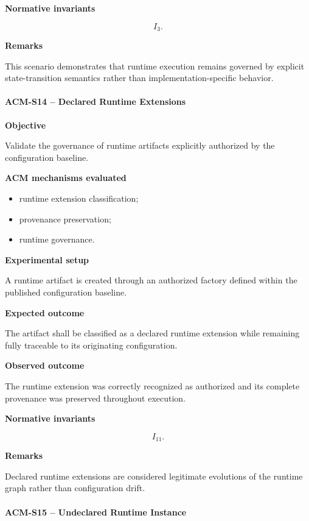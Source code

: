 \documentclass[10pt]{article}
\begin{document}
\textbf{Normative invariants}

\[
I_3.
\]

\textbf{Remarks}

This scenario demonstrates that runtime execution remains governed by explicit
state-transition semantics rather than implementation-specific behavior.

\paragraph{ACM-S14 -- Declared Runtime Extensions}

\textbf{Objective}

Validate the governance of runtime artifacts explicitly authorized by the
configuration baseline.

\textbf{ACM mechanisms evaluated}

\begin{itemize}
    \item runtime extension classification;
    \item provenance preservation;
    \item runtime governance.
\end{itemize}

\textbf{Experimental setup}

A runtime artifact is created through an authorized factory defined within the
published configuration baseline.

\textbf{Expected outcome}

The artifact shall be classified as a declared runtime extension while
remaining fully traceable to its originating configuration.

\textbf{Observed outcome}

The runtime extension was correctly recognized as authorized and its complete
provenance was preserved throughout execution.

\textbf{Normative invariants}

\[
I_{11}.
\]

\textbf{Remarks}

Declared runtime extensions are considered legitimate evolutions of the runtime
graph rather than configuration drift.

\paragraph{ACM-S15 -- Undeclared Runtime Instance}
\end{document}
